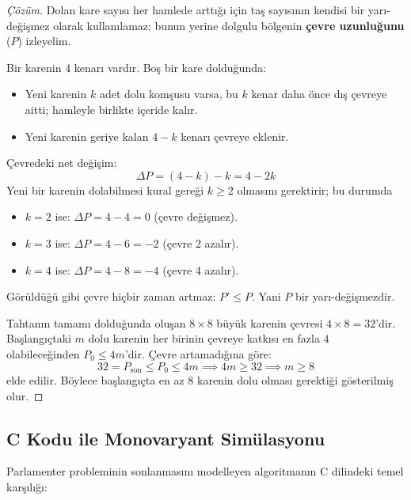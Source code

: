 \begin{proof}[Çözüm]
Dolan kare sayısı her hamlede arttığı için taş sayısının kendisi bir yarı-değişmez olarak kullanılamaz; bunun yerine dolgulu bölgenin \textbf{çevre uzunluğunu} ($P$) izleyelim.

Bir karenin 4 kenarı vardır. Boş bir kare dolduğunda:
\begin{itemize}
    \item Yeni karenin $k$ adet dolu komşusu varsa, bu $k$ kenar daha önce dış çevreye aitti; hamleyle birlikte içeride kalır.
    \item Yeni karenin geriye kalan $4 - k$ kenarı çevreye eklenir.
\end{itemize}
Çevredeki net değişim:
\[
\Delta P = (4 - k) - k = 4 - 2k
\]
Yeni bir karenin dolabilmesi kural gereği $k \ge 2$ olmasını gerektirir; bu durumda
\begin{itemize}
    \item $k = 2$ ise: $\Delta P = 4 - 4 = 0$ (çevre değişmez).
    \item $k = 3$ ise: $\Delta P = 4 - 6 = -2$ (çevre 2 azalır).
    \item $k = 4$ ise: $\Delta P = 4 - 8 = -4$ (çevre 4 azalır).
\end{itemize}
Görüldüğü gibi çevre hiçbir zaman artmaz: $P' \le P$. Yani $P$ bir yarı-değişmezdir.

Tahtanın tamamı dolduğunda oluşan $8 \times 8$ büyük karenin çevresi $4 \times 8 = 32$'dir. Başlangıçtaki $m$ dolu karenin her birinin çevreye katkısı en fazla $4$ olabileceğinden $P_0 \le 4m$'dir. Çevre artamadığına göre:
\[
32 = P_{\text{son}} \le P_0 \le 4m \implies 4m \ge 32 \implies m \ge 8
\]
elde edilir. Böylece başlangıçta en az $8$ karenin dolu olması gerektiği gösterilmiş olur.
\end{proof}

\subsection{C Kodu ile Monovaryant Simülasyonu}

Parlamenter probleminin sonlanmasını modelleyen algoritmanın C dilindeki temel karşılığı:

